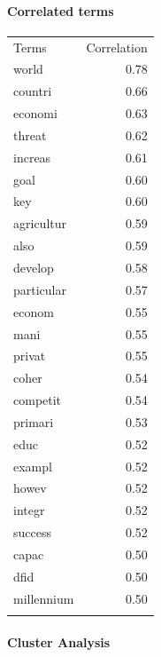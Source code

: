 \documentclass[11pt,article,oneside]{memoir}
\begin{document}
\pagebreak

\paragraph{Correlated terms}\label{correlated-terms}

\begin{longtable}[c]{@{}lr@{}}
\toprule\addlinespace
Terms & Correlation
\\\addlinespace
\midrule\endhead
world & 0.78
\\\addlinespace
countri & 0.66
\\\addlinespace
economi & 0.63
\\\addlinespace
threat & 0.62
\\\addlinespace
increas & 0.61
\\\addlinespace
goal & 0.60
\\\addlinespace
key & 0.60
\\\addlinespace
agricultur & 0.59
\\\addlinespace
also & 0.59
\\\addlinespace
develop & 0.58
\\\addlinespace
particular & 0.57
\\\addlinespace
econom & 0.55
\\\addlinespace
mani & 0.55
\\\addlinespace
privat & 0.55
\\\addlinespace
coher & 0.54
\\\addlinespace
competit & 0.54
\\\addlinespace
primari & 0.53
\\\addlinespace
educ & 0.52
\\\addlinespace
exampl & 0.52
\\\addlinespace
howev & 0.52
\\\addlinespace
integr & 0.52
\\\addlinespace
success & 0.52
\\\addlinespace
capac & 0.50
\\\addlinespace
dfid & 0.50
\\\addlinespace
millennium & 0.50
\\\addlinespace
\bottomrule
\end{longtable}

\paragraph{Cluster Analysis}\label{cluster-analysis}
\end{document}
